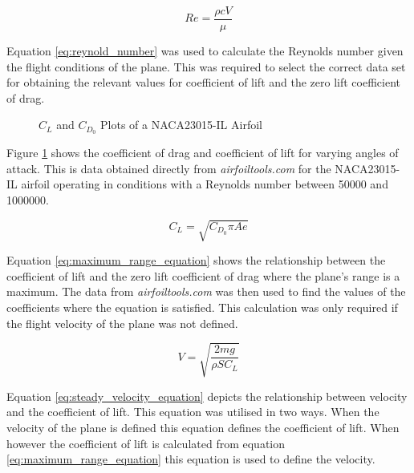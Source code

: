 \documentclass[a4paper,12pt,twoside]{article}
\begin{document}
\begin{equation}
\label{eq:reynold_number}
Re = \frac{\rho c V}{\mu}
\end{equation}

Equation \ref{eq:reynold_number} was used to calculate the Reynolds number given the flight conditions of the plane. This was required to select the correct data set for obtaining the relevant values for coefficient of lift and the zero lift coefficient of drag.

\begin{figure}
	\centering
	
	\caption{$C_L$ and $C_{D_0}$ Plots of a NACA23015-IL Airfoil}
	\label{fig:c_l_and_c_d_0_plots_of_a_naca23015il_airfoil}
\end{figure}

Figure \ref{fig:c_l_and_c_d_0_plots_of_a_naca23015il_airfoil} shows the coefficient of drag and coefficient of lift for varying angles of attack. This is data obtained directly from \textit{airfoiltools.com} for the NACA23015-IL airfoil operating in conditions with a Reynolds number between 50000 and 1000000.

\begin{equation}
\label{eq:maximum_range_equation}
C_L = \sqrt{C_{D_0}\pi A e}
\end{equation}

Equation \ref{eq:maximum_range_equation} shows the relationship between the coefficient of lift and the zero lift coefficient of drag where the plane's range is a maximum. The data from \textit{airfoiltools.com} was then used to find the values of the coefficients where the equation is satisfied. This calculation was only required if the flight velocity of the plane was not defined.

\begin{equation}
\label{eq:steady_velocity_equation}
V=\sqrt{\frac{2mg}{\rho S C_L}}
\end{equation}

Equation \ref{eq:steady_velocity_equation} depicts the relationship between velocity and the coefficient of lift. This equation was utilised in two ways. When the velocity of the plane is defined this equation defines the coefficient of lift. When however the coefficient of lift is calculated from equation \ref{eq:maximum_range_equation} this equation is used to define the velocity.
\end{document}
